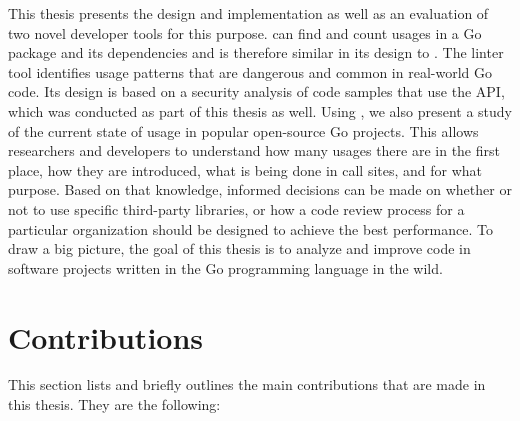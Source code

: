 This thesis presents the design and implementation as well as an evaluation of two novel developer tools for this
purpose.
\toolGeiger{} can find and count \unsafe{} usages in a Go package and its dependencies and is therefore similar in its
design to \toolCargoGeiger{}.
The linter tool \toolSafer{} identifies \unsafe{} usage patterns that are dangerous and common in real-world Go code.
Its design is based on a security analysis of code samples that use the \unsafe{} \acrshort{API}, which was conducted as
part of this thesis as well.
Using \toolGeiger{}, we also present a study of the current state of \unsafe{} usage in popular open-source Go projects.
This allows researchers and developers to understand how many usages there are in the first place, how they are
introduced, what is being done in \unsafe{} call sites, and for what purpose.
Based on that knowledge, informed decisions can be made on whether or not to use specific third-party libraries, or how
a code review process for a particular organization should be designed to achieve the best performance.
To draw a big picture, the goal of this thesis is to analyze and improve \unsafe{} code in software projects written in
the Go programming language in the wild.



\section{Contributions}\label{sec:introduction:contributions}

This section lists and briefly outlines the main contributions that are made in this thesis.
They are the following:

